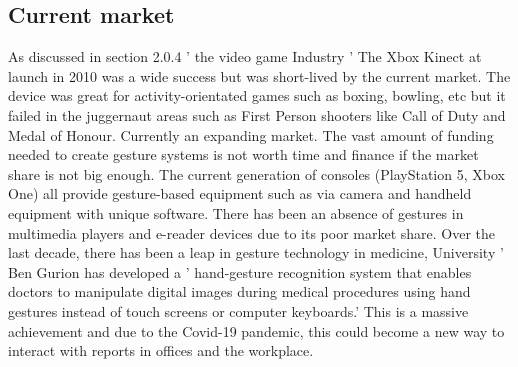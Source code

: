 \subsection{Current market }
As discussed in section 2.0.4 ' the video game Industry ' The Xbox Kinect at launch in 2010 was a wide success but was short-lived by the current market. The device was great for activity-orientated games such as boxing, bowling, etc but it failed in the juggernaut areas such as First Person shooters like Call of Duty and Medal of Honour. Currently an expanding market. The vast amount of funding needed to create gesture systems is not worth time and finance if the market share is not big enough. The current generation of consoles (PlayStation 5, Xbox One) all provide gesture-based equipment such as via camera and handheld equipment with unique software. There has been an absence of gestures in multimedia players and e-reader devices due to its poor market share. Over the last decade, there has been a leap in gesture technology in medicine, University ' Ben Gurion has developed  a ' hand-gesture recognition system that enables doctors to manipulate digital images during medical procedures using hand gestures instead of touch screens or computer keyboards.' This is a massive achievement and due to the Covid-19 pandemic, this could become a new way to interact with reports in offices and the workplace.

